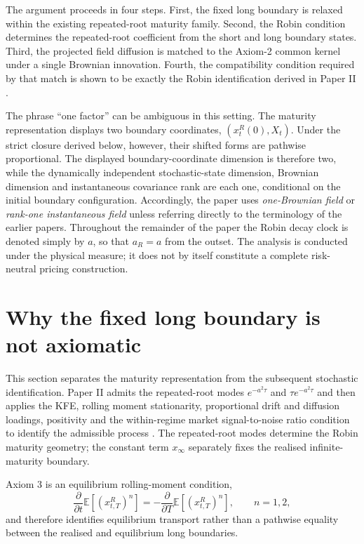 \documentclass[11pt]{article}
\numberwithin{equation}{section}
\newcommand{\E}{\mathbb{E}}
\begin{document}
The argument proceeds in four steps. First, the fixed long boundary is relaxed within the existing repeated-root maturity family. Second, the Robin condition determines the repeated-root coefficient from the short and long boundary states. Third, the projected field diffusion is matched to the Axiom-2 common kernel under a single Brownian innovation. Fourth, the compatibility condition required by that match is shown to be exactly the Robin identification derived in Paper II \cite{OzaShortBoundary}.

The phrase ``one factor'' can be ambiguous in this setting. The maturity representation displays two boundary coordinates, $(x_t^R(0),X_t)$. Under the strict closure derived below, however, their shifted forms are pathwise proportional. The displayed boundary-coordinate dimension is therefore two, while the dynamically independent stochastic-state dimension, Brownian dimension and instantaneous covariance rank are each one, conditional on the initial boundary configuration. Accordingly, the paper uses \emph{one-Brownian field} or \emph{rank-one instantaneous field} unless referring directly to the terminology of the earlier papers. Throughout the remainder of the paper the Robin decay clock is denoted simply by $a$, so that $a_R=a$ from the outset. The analysis is conducted under the physical measure; it does not by itself constitute a complete risk-neutral pricing construction.

\section{Why the fixed long boundary is not axiomatic}

This section separates the maturity representation from the subsequent stochastic identification. Paper II admits the repeated-root modes $e^{-a^2\tau}$ and $\tau e^{-a^2\tau}$ and then applies the KFE, rolling moment stationarity, proportional drift and diffusion loadings, positivity and the within-regime market signal-to-noise ratio condition to identify the admissible process \cite{OzaShortBoundary}. The repeated-root modes determine the Robin maturity geometry; the constant term $x_\infty$ separately fixes the realised infinite-maturity boundary.

Axiom 3 is an equilibrium rolling-moment condition,
\begin{equation}
 \frac{\partial}{\partial t}\E[(x_{t,T}^R)^n]
 =-\frac{\partial}{\partial T}\E[(x_{t,T}^R)^n],
 \qquad n=1,2,
\end{equation}
and therefore identifies equilibrium transport rather than a pathwise equality between the realised and equilibrium long boundaries.
\end{document}
